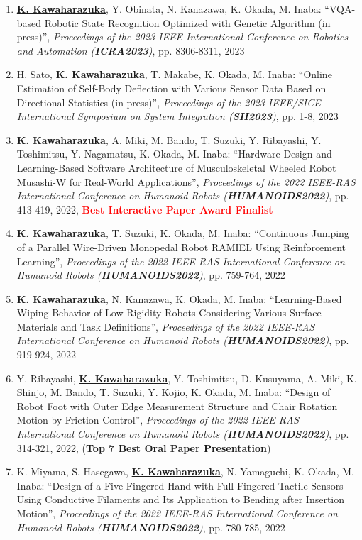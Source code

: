 \documentclass[letterpaper]{article}
\begin{document}
\begin{enumerate}
\item \underline{\textbf{K. Kawaharazuka}}, Y. Obinata, N. Kanazawa, K. Okada, M. Inaba: ``VQA-based Robotic State Recognition Optimized with Genetic Algorithm (in press)'', \textit{Proceedings of the 2023 IEEE International Conference on Robotics and Automation (\textit{\textbf{ICRA2023}})}, pp. 8306-8311, 2023
\item H. Sato, \underline{\textbf{K. Kawaharazuka}}, T. Makabe, K. Okada, M. Inaba: ``Online Estimation of Self-Body Deflection with Various Sensor Data Based on Directional Statistics (in press)'', \textit{Proceedings of the 2023 IEEE/SICE International Symposium on System Integration (\textit{\textbf{SII2023}})}, pp. 1-8, 2023
\item \underline{\textbf{K. Kawaharazuka}}, A. Miki, M. Bando, T. Suzuki, Y. Ribayashi, Y. Toshimitsu, Y. Nagamatsu, K. Okada, M. Inaba: ``Hardware Design and Learning-Based Software Architecture of Musculoskeletal Wheeled Robot Musashi-W for Real-World Applications'', \textit{Proceedings of the 2022 IEEE-RAS International Conference on Humanoid Robots (\textit{\textbf{HUMANOIDS2022}})}, pp. 413-419, 2022, \textbf{\textcolor{red}{Best Interactive Paper Award Finalist}}
\item \underline{\textbf{K. Kawaharazuka}}, T. Suzuki, K. Okada, M. Inaba: ``Continuous Jumping of a Parallel Wire-Driven Monopedal Robot RAMIEL Using Reinforcement Learning'', \textit{Proceedings of the 2022 IEEE-RAS International Conference on Humanoid Robots (\textit{\textbf{HUMANOIDS2022}})}, pp. 759-764, 2022
\item \underline{\textbf{K. Kawaharazuka}}, N. Kanazawa, K. Okada, M. Inaba: ``Learning-Based Wiping Behavior of Low-Rigidity Robots Considering Various Surface Materials and Task Definitions'', \textit{Proceedings of the 2022 IEEE-RAS International Conference on Humanoid Robots (\textit{\textbf{HUMANOIDS2022}})}, pp. 919-924, 2022
\item Y. Ribayashi, \underline{\textbf{K. Kawaharazuka}}, Y. Toshimitsu, D. Kusuyama, A. Miki, K. Shinjo, M. Bando, T. Suzuki, Y. Kojio, K. Okada, M. Inaba: ``Design of Robot Foot with Outer Edge Measurement Structure and Chair Rotation Motion by Friction Control'', \textit{Proceedings of the 2022 IEEE-RAS International Conference on Humanoid Robots (\textit{\textbf{HUMANOIDS2022}})}, pp. 314-321, 2022, (\textbf{Top 7 Best Oral Paper Presentation})
\item K. Miyama, S. Hasegawa, \underline{\textbf{K. Kawaharazuka}}, N. Yamaguchi, K. Okada, M. Inaba: ``Design of a Five-Fingered Hand with Full-Fingered Tactile Sensors Using Conductive Filaments and Its Application to Bending after Insertion Motion'', \textit{Proceedings of the 2022 IEEE-RAS International Conference on Humanoid Robots (\textit{\textbf{HUMANOIDS2022}})}, pp. 780-785, 2022

\end{enumerate}
\end{document}
